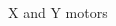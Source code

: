 \begin{frame}{X and Y motors}
\begin{columns}[T] %
    \begin{column}{0.5\textwidth} %
        \centering
    \end{column}
    \begin{column}{0.5\textwidth} %

\end{column}
\end{columns}
\end{frame}

